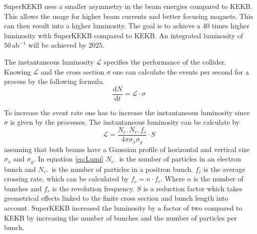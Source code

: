 \documentclass[a4paper,11pt,twosided,final,german,openbib,pdftex,listof=totoc,bibliography=totoc]{scrbook}
\begin{document}
SuperKEKB uses a smaller asymmetry in the beam energies compared to KEKB. This allows the usage for higher beam currents and better focusing magnets. This can then result into a higher luminosity. The goal is to achieve a 40 times higher luminosity with SuperKEKB compared to KEKB.
An integrated luminosity of $50\,\textrm{ab}^{-1}$ will be achieved by 2025.\cite{B2B}

The instantaneous luminosity $\mathcal{L}$ specifies the performance of the collider. Knowing $\mathcal{L} $ and the cross section $\sigma$ one can calculate the events per second for a process by the following formula.
\begin{equation}
\frac{\textrm{d}N}{\textrm{d}t} = \mathcal{L} \cdot \sigma
\end{equation} 

To increase the event rate one has to increase the instantaneous luminosity since $\sigma$ is given by the processes. The instantaneous luminosity can be calculate by
\begin{equation}
	\mathcal{L} = \frac{N_{e^-}N_{e^+}f_c}{4\pi \sigma_x \sigma_y} \cdot S
	\label{eq:Lumi}
\end{equation}
 assuming that both beams have a Gaussian profile of horizontal and vertical size $\sigma_x$ and $\sigma_y$. In equation \ref{eq:Lumi} $N_{e^-}$ is the number of particles in an electron bunch and $N_{e^+}$ is the number of particles in a positron bunch. $f_c$ is the average crossing rate, which can be calculated by $f_c = n \cdot f_r$. Where $n$ is the number of bunches and $f_r$ is the revolution frequency. $S$ is a reduction factor which takes geometrical effects linked to the finite cross section and bunch length into account.\cite{herr2006concept} SuperKEKB increased the luminosity by a factor of two compared to KEKB by increasing the number of bunches and the number of particles per bunch.
 
\end{document}
